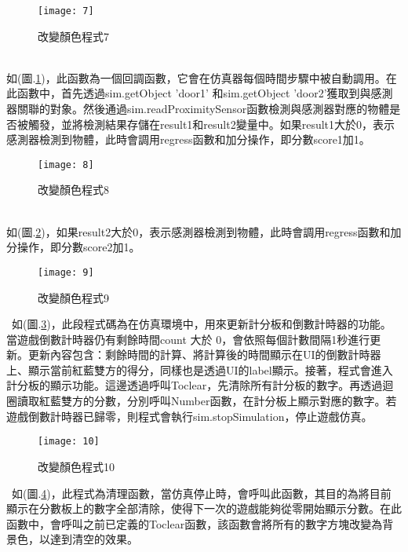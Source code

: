 \begin{figure}[hbt!]
\begin{center}
\texttt{[image: 7]}
\caption{\Large 改變顏色程式7}\label{改變顏色程式7}
\end{center}
\end{figure}\
\\
如(圖.\ref{改變顏色程式7})，此函數為一個回調函數，它會在仿真器每個時間步驟中被自動調用。在此函數中，首先透過sim.getObject 'door1' 和sim.getObject 'door2'獲取到與感測器關聯的對象。然後通過sim.readProximitySensor函數檢測與感測器對應的物體是否被觸發，並將檢測結果存儲在result1和result2變量中。如果result1大於0，表示感測器檢測到物體，此時會調用regress函數和加分操作，即分數score1加1。\
\begin{figure}[hbt!]
\begin{center}
\texttt{[image: 8]}
\caption{\Large 改變顏色程式8}\label{改變顏色程式8}
\end{center}
\end{figure}\
\\
如(圖.\ref{改變顏色程式8})，如果result2大於0，表示感測器檢測到物體，此時會調用regress函數和加分操作，即分數score2加1。\
\newpage
\begin{figure}[hbt!]
\begin{center}
\texttt{[image: 9]}
\caption{\Large 改變顏色程式9}\label{改變顏色程式9}
\end{center}
\end{figure}\
如(圖.\ref{改變顏色程式9})，此段程式碼為在仿真環境中，用來更新計分板和倒數計時器的功能。當遊戲倒數計時器仍有剩餘時間count 大於 0，會依照每個計數間隔1秒進行更新。更新內容包含：剩餘時間的計算、將計算後的時間顯示在UI的倒數計時器上、顯示當前紅藍雙方的得分，同樣也是透過UI的label顯示。接著，程式會進入計分板的顯示功能。這邊透過呼叫Toclear，先清除所有計分板的數字。再透過迴圈讀取紅藍雙方的分數，分別呼叫Number函數，在計分板上顯示對應的數字。若遊戲倒數計時器已歸零，則程式會執行sim.stopSimulation，停止遊戲仿真。\
\begin{figure}[hbt!]
\begin{center}
\texttt{[image: 10]}
\caption{\Large 改變顏色程式10}\label{改變顏色程式10}
\end{center}
\end{figure}\
如(圖.\ref{改變顏色程式10})，此程式為清理函數，當仿真停止時，會呼叫此函數，其目的為將目前顯示在分數板上的數字全部清除，使得下一次的遊戲能夠從零開始顯示分數。在此函數中，會呼叫之前已定義的Toclear函數，該函數會將所有的數字方塊改變為背景色，以達到清空的效果。\
\newpage
